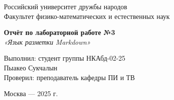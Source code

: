 \begin{titlepage}
\centering
{\Large Российский университет дружбы народов \\[0.5cm]
Факультет физико-математических и естественных наук \\[4cm]}

{\Huge \textbf{Отчёт по лабораторной работе №3} \\[0.3cm]
\Large \textit{«Язык разметки Markdown»} \\[4cm]}

\begin{flushright}
\large
Выполнил: студент группы НКАбд-02-25\\
Пыакео Сукчалын \\[1cm]
Проверил: преподаватель кафедры ПИ и ТВ \\[1cm]
\end{flushright}

\vfill
Москва — 2025 г.
\end{titlepage}
